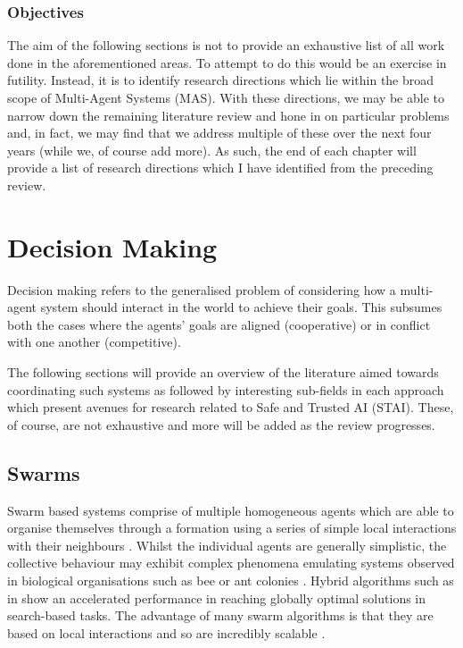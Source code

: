 \documentclass[preprint,8pt]{report}
\begin{document}
\subsection*{Objectives}

The aim of the following sections is not to provide an exhaustive list of all work done in the aforementioned areas. To attempt to do this would be an exercise in futility. Instead, it is to identify research directions which lie within the broad scope of Multi-Agent Systems (MAS). With these directions, we may be able to narrow down the remaining literature review and hone in on particular problems and, in fact, we may find that we address multiple of these over the next four years (while we, of course add more). As such, the end of each chapter will provide a list of research directions which I have identified from the preceding review. 

\chapter{Decision Making}

Decision making refers to the generalised problem of considering how a multi-agent system should interact in the world to achieve their goals. This subsumes both the cases where the agents' goals are aligned (cooperative) or in conflict with one another (competitive). 

The following sections will provide an overview of the literature aimed towards coordinating such systems as followed by interesting sub-fields in each approach which present avenues for research related to Safe and Trusted AI (STAI). These, of course, are not exhaustive and more will be added as the review progresses.

\section{Swarms}

Swarm based systems comprise of multiple homogeneous agents which are able to organise themselves through a formation using a series of simple local interactions with their neighbours \cite{Couceiro2015}. Whilst the individual agents are generally simplistic, the collective behaviour may exhibit complex phenomena emulating systems observed in biological organisations such as bee or ant colonies \cite{Sethi2017}. Hybrid algorithms such as in \cite{Gao2018} show an accelerated performance in reaching globally optimal solutions in search-based tasks. The advantage of many swarm algorithms is that they are based on local interactions and so are incredibly scalable \cite{Rizk2018}. 
\end{document}
